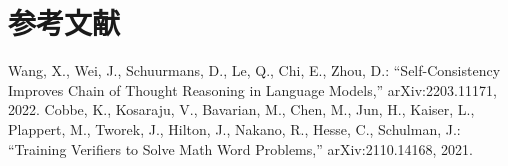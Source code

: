 \documentclass{ipsj}
\begin{document}
\section*{参考文献}
\begin{thebibliography}{9}
 Wang, X., Wei, J., Schuurmans, D., Le, Q., Chi, E., Zhou, D.: “Self-Consistency Improves Chain of Thought Reasoning in Language Models,” arXiv:2203.11171, 2022.
 Cobbe, K., Kosaraju, V., Bavarian, M., Chen, M., Jun, H., Kaiser, L., Plappert, M., Tworek, J., Hilton, J., Nakano, R., Hesse, C., Schulman, J.: “Training Verifiers to Solve Math Word Problems,” arXiv:2110.14168, 2021.
\end{thebibliography}
\end{document}
